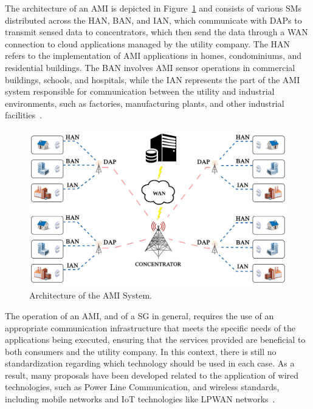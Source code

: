 \documentclass[a4paper,fleqn]{cas-dc}
\begin{document}
The architecture of an \gls{AMI} is depicted in Figure~\ref{fig:ami} and consists of various \gls{SMs} distributed across the \gls{HAN}, \gls{BAN}, and \gls{IAN}, which communicate with \gls{DAPs} to transmit sensed data to concentrators, which then send the data through a \gls{WAN} connection to cloud applications managed by the utility company. The \gls{HAN} refers to the implementation of \gls{AMI} applications in homes, condominiums, and residential buildings. The \gls{BAN} involves \gls{AMI} sensor operations in commercial buildings, schools, and hospitals, while the \gls{IAN} represents the part of the \gls{AMI} system responsible for communication between the utility and industrial environments, such as factories, manufacturing plants, and other industrial facilities~\cite{veloso2021hydsmaas}.

\begin{figure}[ht]
    \centering
    \includegraphics[width=0.98\linewidth]{imgs/ami.png}
    \caption{Architecture of the \gls{AMI} System.}
    \label{fig:ami}
\end{figure}

The operation of an \gls{AMI}, and of a SG in general, requires the use of an appropriate communication infrastructure that meets the specific needs of the applications being executed, ensuring that the services provided are beneficial to both consumers and the utility company. In this context, there is still no standardization regarding which technology should be used in each case. As a result, many proposals have been developed related to the application of wired technologies, such as Power Line Communication, and wireless standards, including mobile networks and \gls{IoT} technologies like \gls{LPWAN} networks~\cite{mohapatra2021fault}.
\end{document}
